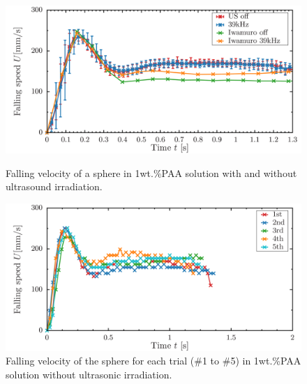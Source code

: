 \begin{figure}[ht]
    \centering
    \includegraphics[width=12cm,clip]{./X-Appendix/s1.png}
    \caption{Falling velocity of a sphere in 1wt.\%PAA solution with and without ultrasound irradiation.}
    \label{fig:1-1PAA-falling}
    \centering
    \includegraphics[width=12cm,clip]{X-Appendix/s1-0-1-5.png}
    \caption{Falling velocity of the sphere for each trial (\#1 to \#5) in 1wt.\%PAA solution without ultrasonic irradiation.}
    \label{fig:1-1PAA-falling1-5}
\end{figure}
